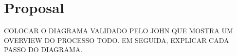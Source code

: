 \documentclass[12pt]{article}
\begin{document}

\section{Proposal}\label{section:proposal}


COLOCAR O DIAGRAMA VALIDADO PELO JOHN QUE MOSTRA UM OVERVIEW DO PROCESSO TODO. EM SEGUIDA, EXPLICAR CADA PASSO DO DIAGRAMA.
\end{document}
